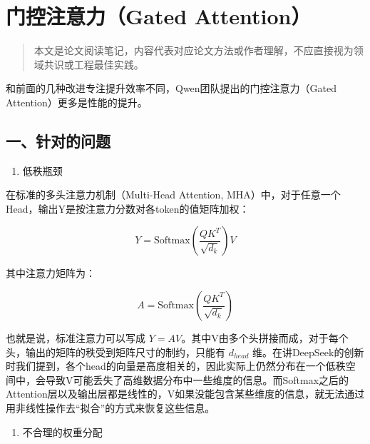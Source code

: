 \setcounter{section}{9}

\hypertarget{ux95e8ux63a7ux6ce8ux610fux529bgated-attention}{%
\section{门控注意力（Gated Attention）}\label{ux95e8ux63a7ux6ce8ux610fux529bgated-attention}}

\begin{quote}
本文是论文阅读笔记，内容代表对应论文方法或作者理解，不应直接视为领域共识或工程最佳实践。
\end{quote}

和前面的几种改进专注提升效率不同，Qwen团队提出的门控注意力（Gated Attention）更多是性能的提升。

\hypertarget{ux4e00ux9488ux5bf9ux7684ux95eeux9898}{%
\subsection{一、针对的问题}\label{ux4e00ux9488ux5bf9ux7684ux95eeux9898}}

\begin{enumerate}
\def\labelenumi{\arabic{enumi}.}
\tightlist
\item
  低秩瓶颈
\end{enumerate}

在标准的多头注意力机制（Multi-Head Attention, MHA）中，对于任意一个Head，输出Y是按注意力分数对各token的值矩阵加权：

\[
Y=\mathrm{Softmax}\left(\frac{QK^T}{\sqrt{d_k}}\right)V
\]

其中注意力矩阵为：

\[
A=\mathrm{Softmax}\left(\frac{QK^T}{\sqrt{d_k}}\right)
\]

也就是说，标准注意力可以写成 \(Y=AV\)。其中V由多个头拼接而成，对于每个头，输出的矩阵的秩受到矩阵尺寸的制约，只能有 \(d_{head}\) 维。在讲DeepSeek的创新时我们提到，各个head的向量是高度相关的，因此实际上仍然分布在一个低秩空间中，会导致V可能丢失了高维数据分布中一些维度的信息。而Softmax之后的Attention层以及输出层都是线性的，V如果没能包含某些维度的信息，就无法通过用非线性操作去``拟合''的方式来恢复这些信息。

\begin{enumerate}
\def\labelenumi{\arabic{enumi}.}
\setcounter{enumi}{1}
\tightlist
\item
  不合理的权重分配
\end{enumerate}

